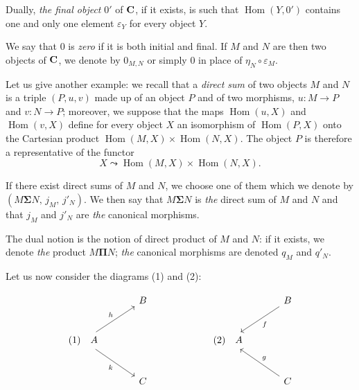 Dually, \emph{the final object} $0'$ of $\mathbf{C}$, if it exists, is such that
$\operatorname{Hom}(Y,0')$ contains one and only one element $\varepsilon_Y$
for every object $Y$.

We say that $0$ is \emph{zero} if it is both initial and final. If $M$ and
$N$ are then two objects of $\mathbf{C}$, we denote by $0_{M,N}$ or simply $0$ in
place of $\eta_N\circ\varepsilon_M$.

Let us give another example: we recall that a \emph{direct sum} of two objects
$M$ and $N$ is a triple $(P,u,v)$ made up of an object $P$ and of two
morphisms, $u\colon M\to P$ and $v\colon N\to P$; moreover, we suppose that
the maps $\operatorname{Hom}(u,X)$ and $\operatorname{Hom}(v,X)$ define for
every object $X$ an isomorphism of $\operatorname{Hom}(P,X)$ onto the
Cartesian product
$\operatorname{Hom}(M,X)\times\operatorname{Hom}(N,X)$. The object $P$ is
therefore a representative of the functor
\[
  X \leadsto \operatorname{Hom}(M,X)\times\operatorname{Hom}(N,X).
\]

If there exist direct sums of $M$ and $N$, we choose one of them which we
denote by $(M\boldsymbol{\Sigma}N,\, j_M,\, j'_N)$. We then say that
$M\boldsymbol{\Sigma}N$ is \emph{the} direct sum of $M$ and $N$ and that
$j_M$ and $j'_N$ are \emph{the} canonical morphisms.

The dual notion is the notion of direct product of $M$ and $N$: if it exists,
we denote \emph{the} product $M\boldsymbol{\Pi}N$; \emph{the} canonical
morphisms are denoted $q_M$ and $q'_N$.

Let us now consider the diagrams (1) and (2):

\[
\begin{tikzcd}[row sep=2.6em, column sep=3.4em]
& B \\
(1)\quad A \arrow[ur, "h"] \arrow[dr, "k"'] & \\
& C
\end{tikzcd}
\qquad\qquad\qquad
\begin{tikzcd}[row sep=2.6em, column sep=3.4em]
& B \arrow[dl, "f"] \\
(2)\quad A & \\
& C \arrow[ul, "g"']
\end{tikzcd}
\]

